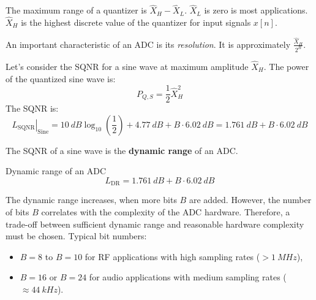 \begin{refsection}
The maximum range of a quantizer is $\hat{X}_H - \hat{X}_L$. $\hat{X}_L$ is zero is most applications. $\hat{X}_H$ is the highest discrete value of the quantizer for input signals $x[n]$.

An important characteristic of an \ac{ADC} is its \emph{resolution}. It is approximately $\frac{\hat{X}_H}{2^B}$.

Let's consider the \ac{SQNR} for a sine wave at maximum amplitude $\hat{X}_H$. The power of the quantized sine wave is:
\begin{equation}
	P_{Q,S} = \frac{1}{2} \hat{X}_H^2
\end{equation}
The \ac{SQNR} is:
\begin{equation}
	\left.L_{\mathrm{SQNR}}\right|_{\text{Sine}} = \SI{10}{dB} \log_{10}\left(\frac{1}{2}\right) + \SI{4.77}{dB} + B \cdot \SI{6.02}{dB} = \SI{1.761}{dB} + B \cdot \SI{6.02}{dB}
\end{equation}

The \ac{SQNR} of a sine wave is the  \textbf{dynamic range} of an \ac{ADC}.
\begin{definition}{Dynamic range of an \ac{ADC}}
	\begin{equation}
		L_{\mathrm{DR}} = \SI{1.761}{dB} + B \cdot \SI{6.02}{dB}
	\end{equation}
\end{definition}

The dynamic range increases, when more bits $B$ are added. However, the number of bits $B$ correlates with the complexity of the \ac{ADC} hardware. Therefore, a trade-off between sufficient dynamic range and reasonable hardware complexity must be chosen. Typical bit numbers:
\begin{itemize}
	\item $B = 8$ to $B = 10$ for \ac{RF} applications with high sampling rates ($> \SI{1}{MHz}$),
	\item $B = 16$ or $B = 24$ for audio applications with medium sampling rates ($\approx \SI{44}{kHz}$).
\end{itemize}


%


\end{refsection}
